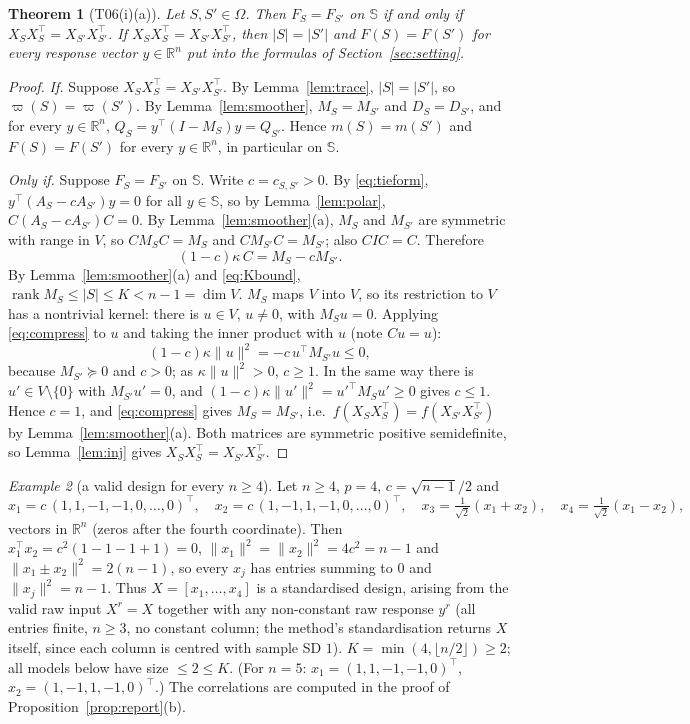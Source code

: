 \documentclass[11pt]{article}
\newtheorem{theorem}{Theorem}[section]
\theoremstyle{remark}
\newtheorem{example}[theorem]{Example}
\newcommand{\R}{\mathbb R}
\newcommand{\Sph}{\mathbb S}
\DeclareMathOperator{\rank}{rank}
\begin{document}
\begin{theorem}[T06(i)(a)]\label{thm:iff}
Let $S,S'\in\Omega$. Then $F_S=F_{S'}$ on $\Sph$ if and only if $X_SX_S^\top=X_{S'}X_{S'}^\top$. If $X_SX_S^\top=X_{S'}X_{S'}^\top$, then $|S|=|S'|$ and $F(S)=F(S')$ for every response vector $y\in\R^n$ put into the formulas of Section~\ref{sec:setting}.
\end{theorem}
\begin{proof}
\emph{If.} Suppose $X_SX_S^\top=X_{S'}X_{S'}^\top$. By Lemma~\ref{lem:trace}, $|S|=|S'|$, so $\varpi(S)=\varpi(S')$. By Lemma~\ref{lem:smoother}, $M_S=M_{S'}$ and $D_S=D_{S'}$, and for every $y\in\R^n$, $Q_S=y^\top(I-M_S)y=Q_{S'}$. Hence $m(S)=m(S')$ and $F(S)=F(S')$ for every $y\in\R^n$, in particular on $\Sph$.

\emph{Only if.} Suppose $F_S=F_{S'}$ on $\Sph$. Write $c=c_{S,S'}>0$. By \eqref{eq:tieform}, $y^\top(A_S-cA_{S'})y=0$ for all $y\in\Sph$, so by Lemma~\ref{lem:polar}, $C(A_S-cA_{S'})C=0$. By Lemma~\ref{lem:smoother}(a), $M_S$ and $M_{S'}$ are symmetric with range in $V$, so $CM_SC=M_S$ and $CM_{S'}C=M_{S'}$; also $CIC=C$. Therefore
\begin{equation}\label{eq:compress}
(1-c)\kappa\,C=M_S-cM_{S'} .
\end{equation}
By Lemma~\ref{lem:smoother}(a) and \eqref{eq:Kbound}, $\rank M_S\le|S|\le K<n-1=\dim V$. $M_S$ maps $V$ into $V$, so its restriction to $V$ has a nontrivial kernel: there is $u\in V$, $u\ne0$, with $M_Su=0$. Applying \eqref{eq:compress} to $u$ and taking the inner product with $u$ (note $Cu=u$):
\[
(1-c)\kappa\|u\|^2=-c\,u^\top M_{S'}u\le0 ,
\]
because $M_{S'}\succeq0$ and $c>0$; as $\kappa\|u\|^2>0$, $c\ge1$. In the same way there is $u'\in V\setminus\{0\}$ with $M_{S'}u'=0$, and $(1-c)\kappa\|u'\|^2=u'^\top M_Su'\ge0$ gives $c\le1$. Hence $c=1$, and \eqref{eq:compress} gives $M_S=M_{S'}$, i.e.\ $f(X_SX_S^\top)=f(X_{S'}X_{S'}^\top)$ by Lemma~\ref{lem:smoother}(a). Both matrices are symmetric positive semidefinite, so Lemma~\ref{lem:inj} gives $X_SX_S^\top=X_{S'}X_{S'}^\top$.
\end{proof}

\begin{example}[a valid design for every $n\ge4$]\label{ex:design}
Let $n\ge4$, $p=4$, $c=\sqrt{n-1}/2$ and
\[
x_1=c\,(1,1,-1,-1,0,\dots,0)^\top,\quad x_2=c\,(1,-1,1,-1,0,\dots,0)^\top,\quad x_3=\tfrac{1}{\sqrt2}(x_1+x_2),\quad x_4=\tfrac1{\sqrt2}(x_1-x_2),
\]
vectors in $\R^n$ (zeros after the fourth coordinate). Then $x_1^\top x_2=c^2(1-1-1+1)=0$, $\|x_1\|^2=\|x_2\|^2=4c^2=n-1$ and $\|x_1\pm x_2\|^2=2(n-1)$, so every $x_j$ has entries summing to $0$ and $\|x_j\|^2=n-1$. Thus $X=[x_1,\dots,x_4]$ is a standardised design, arising from the valid raw input $X^r=X$ together with any non-constant raw response $y^r$ (all entries finite, $n\ge3$, no constant column; the method's standardisation returns $X$ itself, since each column is centred with sample SD $1$). $K=\min(4,\lfloor n/2\rfloor)\ge2$; all models below have size $\le2\le K$. (For $n=5$: $x_1=(1,1,-1,-1,0)^\top$, $x_2=(1,-1,1,-1,0)^\top$.) The correlations are computed in the proof of Proposition~\ref{prop:report}(b).
\end{example}
\end{document}
